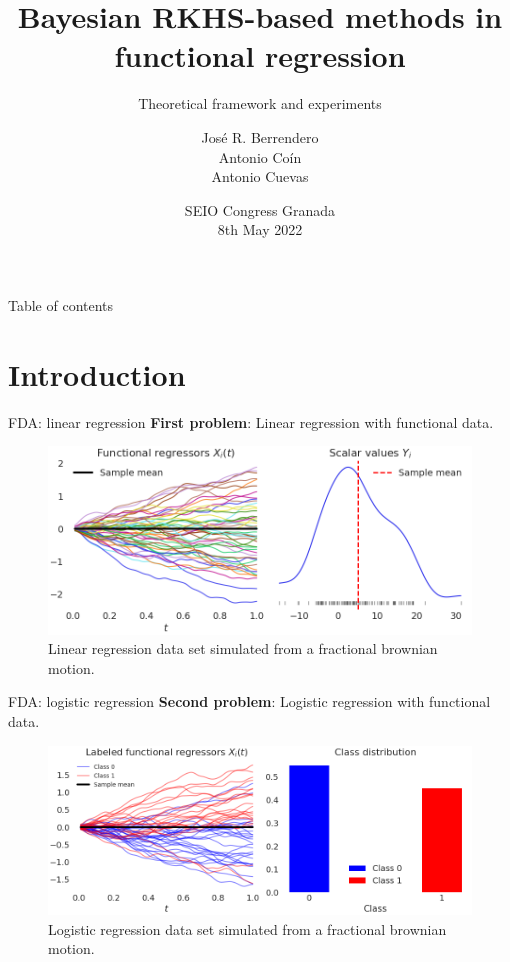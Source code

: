 \documentclass[10pt, english, professionalfonts]{beamer}
\title{Bayesian RKHS-based methods in functional regression}
\subtitle{Theoretical framework and experiments}
\date{SEIO Congress Granada\\ 8th May 2022\\}
\author{José R. Berrendero \\ Antonio Coín  \\ Antonio Cuevas\\}
\institute{Universidad Autónoma de Madrid \\ \textit{Departamento de Matemáticas}}
\newcommand\maroon[1]{\color{mLightBrown}#1\color{mDarkTeal}}
\begin{document}
\maketitle

\begin{frame}{Table of contents}
  \tableofcontents
\end{frame}

\section{Introduction}

\begin{frame}{FDA: linear regression}
  \textbf{First problem}: \maroon{Linear } regression with functional data.
  \vspace{1em}

\begin{figure}
    \includegraphics[width=\textwidth]{img/data_lin}
    \caption{Linear regression data set simulated from a fractional brownian motion.}
  \end{figure}
  \vspace{-1em}
\end{frame}
\begin{frame}{FDA: logistic regression}
  \textbf{Second problem}: \maroon{Logistic } regression with functional data.
\vspace{1em}

\begin{figure}
    \includegraphics[width=\textwidth]{img/data_log}
    \caption{Logistic regression data set simulated from a fractional brownian motion.}
  \end{figure}
  \vspace{-1em}
\end{frame}
\end{document}
